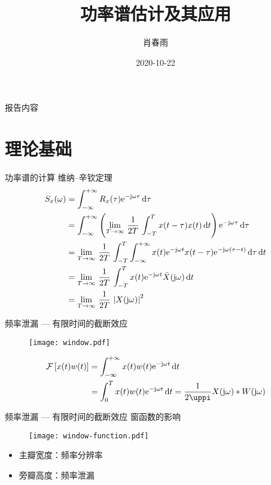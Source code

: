 \documentclass{beamer}
\title{功率谱估计及其应用}
\date{2020-10-22}
\author{肖春雨}
\institute{华中科技大学}
\begin{document}
\maketitle

\begin{frame}{报告内容}
    \tableofcontents
\end{frame}

\section{理论基础}
\begin{frame}{功率谱的计算}
    维纳--辛钦定理
    \begin{align*}
        S_x(\omega) &= \int_{-\infty}^{+\infty} R_x(\tau) \mathrm{e}^{-\mathrm{j}\omega\tau} \mathop{}\!\mathrm{d} \tau \\
        &= \int_{-\infty}^{+\infty} \left( \lim_{T \to \infty} \, \frac{1}{2T} \, \int_{-T}^{T} x(t-\tau)x(t) \mathop{}\!\mathrm{d} t   \right) \mathrm{e}^{-\mathrm{j}\omega\tau} \mathop{}\!\mathrm{d} \tau  \\
        &= \lim_{T \to \infty} \, \frac{1}{2T} \, \int_{-T}^{T} \int_{-\infty}^{+\infty} x(t)\mathrm{e}^{-\mathrm{j} \omega t} x(t-\tau)\mathrm{e}^{-\mathrm{j}\omega(\tau-t)} \mathop{}\!\mathrm{d} \tau \mathop{}\!\mathrm{d} t \\
        &= \lim_{T \to \infty} \, \frac{1}{2T} \, \int_{-T}^{T}  x(t)\mathrm{e}^{-\mathrm{j} \omega t} \bar{X}(\mathrm{j}\omega) \mathop{}\!\mathrm{d} t \\
        &= \lim_{T \to \infty} \, \frac{1}{2T} \, \left| X(\mathrm{j}\omega) \right|^2
    \end{align*}
\end{frame}


\begin{frame}{频率泄漏 --- 有限时间的截断效应}
    \begin{figure}
        \centering
        \texttt{[image: window.pdf]}
    \end{figure}
    \begin{align*}
        \mathcal{F}\left[x(t)w(t)\right] &= \int_{-\infty}^{+\infty} x(t)w(t) \e{-\j\omega t} \dif t \\
        &= \int_{0}^{T} x(t)w(t) \e{-\j\omega t} \dif t 
        = \frac{1}{2\uppi} X(\j\omega) \ast W(\j\omega)
    \end{align*}
\end{frame}

\begin{frame}{频率泄漏 --- 有限时间的截断效应}
    窗函数的影响
    \begin{figure}
        \centering
        \texttt{[image: window-function.pdf]}
    \end{figure}
    \begin{itemize}
        \item 主瓣宽度：频率分辨率
        \item 旁瓣高度：频率泄漏
    \end{itemize}
\end{frame}
\end{document}
